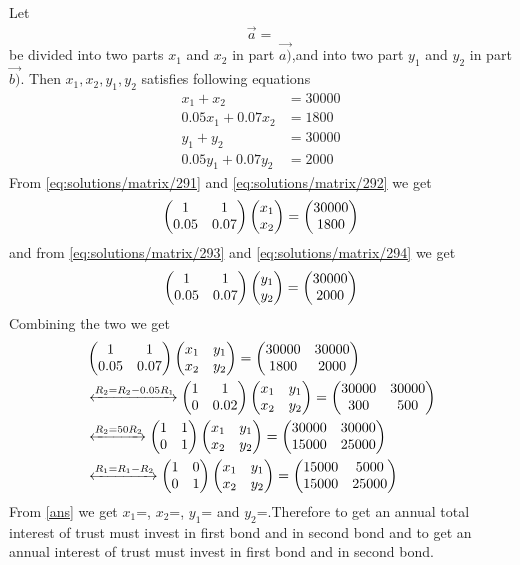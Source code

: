 Let 
\begin{align}
	\vec{a} = 
\end{align}
 be divided into two parts $x_1$ and $x_2$ in part $\vec{a)}$,and into two part $y_1$ and $y_2$ in part $\vec{b)}$. Then $x_1,x_2,y_1,y_2$ satisfies following equations
\begin{align}
  x_1+x_2 &= 30000\label{eq:solutions/matrix/291}\\
  0.05x_1+0.07x_2 &= 1800\label{eq:solutions/matrix/292}\\
  y_1+y_2 &= 30000\label{eq:solutions/matrix/293}\\
  0.05y_1+0.07y_2 &= 2000\label{eq:solutions/matrix/294}
\end{align}
From \eqref{eq:solutions/matrix/291} and \eqref{eq:solutions/matrix/292} we get
\begin{align}
  \begin{pmatrix} 1&1\\0.05&0.07\end{pmatrix}\begin{pmatrix} x_1\\x_2\end{pmatrix} = \begin{pmatrix} 30000\\1800\end{pmatrix}
\end{align}
and from \eqref{eq:solutions/matrix/293} and \eqref{eq:solutions/matrix/294} we get
\begin{align}
  \begin{pmatrix} 1&1\\0.05&0.07\end{pmatrix}\begin{pmatrix} y_1\\y_2\end{pmatrix} = \begin{pmatrix} 30000\\2000\end{pmatrix}
\end{align}
Combining the two we get
\begin{align}
  &\begin{pmatrix} 1&1\\0.05&0.07\end{pmatrix}\begin{pmatrix} x_1&y_1\\x_2&y_2\end{pmatrix} = \begin{pmatrix} 30000&30000\\1800&2000\end{pmatrix} \nonumber \\
  &\xleftrightarrow{R_2 = R_2 - 0.05 R_1}\begin{pmatrix} 1&1\\0&0.02\end{pmatrix}\begin{pmatrix} x_1&y_1\\x_2&y_2\end{pmatrix} = \begin{pmatrix} 30000&30000\\300&500\end{pmatrix} \nonumber \\
  &\xleftrightarrow{R_2 = 50R_2}\begin{pmatrix} 1&1\\0&1\end{pmatrix}\begin{pmatrix} x_1&y_1\\x_2&y_2\end{pmatrix} = \begin{pmatrix} 30000&30000\\15000&25000\end{pmatrix} \nonumber \\
  &\xleftrightarrow{R_1 = R_1-R_2}\begin{pmatrix} 1&0\\0&1\end{pmatrix}\begin{pmatrix} x_1&y_1\\x_2&y_2\end{pmatrix} = \begin{pmatrix} 15000&5000\\15000&25000\end{pmatrix}\label{ans}
\end{align}
From \eqref{ans} we get $x_1$=, $x_2$=, $y_1$= and $y_2$=.Therefore to get an annual total interest of  trust must invest  in first bond and  in second bond and to get an annual interest of  trust must invest  in first bond and  in second bond.
